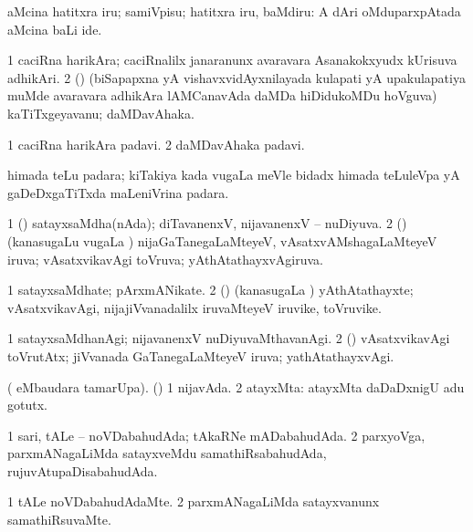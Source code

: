\noindent 
\gl{\pagu}
\expl{}
 aMcina hatitxra iru; samiVpisu; hatitxra iru, baMdiru:  A dAri oMduparxpAtada aMcina baLi ide. \eentry

\bentry
{} 
\gl{\nA}
\bmng
\bnum
\num{1} caciRna harikAra; caciRnalilx janaranunx avaravara Asanakokxyudx kUrisuva adhikAri. 
\num{2} (\birx) (biSapapxna yA vishavxvidAyxnilayada kulapati yA upakulapatiya muMde avaravara adhikAra lAMCanavAda daMDa hiDidukoMDu hoVguva) kaTiTxgeyavanu; daMDavAhaka. 
\enum
\emng
\eentry

\bentry
{} 
\gl{\nA}
\expl{}
\bmng
\bnum
\num{1} caciRna harikAra padavi. 
\num{2} daMDavAhaka padavi. 
\enum
\emng
\eentry

\bentry
{} 
\gl{\nA}
\expl{}
\bmng
 himada teLu padara; kiTakiya kada \mo vugaLa meVle bidadx himada teLuleVpa yA gaDeDxgaTiTxda maLeniVrina padara. 
\emng
\eentry

\bentry
{} 
\gl{\gu}
\expl{}
\bmng
\bnum
\num{1} (\aupa) satayxsaMdha(nAda); diTavanenxV, nijavanenxV -- nuDiyuva. 
\num{2} (\mashA) (kanasugaLu \mo vugaLa \vi) nijaGaTanegaLaMteyeV, vAsatxvAMshagaLaMteyeV iruva; vAsatxvikavAgi toVruva; yAthAtathayxvAgiruva. 
\enum
\emng
\eentry

\bentry
{} 
\gl{\nA}
\expl{}
\bmng
\bnum
\num{1} satayxsaMdhate; pArxmANikate. 
\num{2} (\mashA) (kanasugaLa \vi) yAthAtathayxte; vAsatxvikavAgi, nijajiVvanadalilx iruvaMteyeV iruvike, toVruvike. 
\enum
\emng
\eentry

\bentry
{} 
\gl{\kirxvi}
\expl{}
\bmng
\bnum
\num{1} satayxsaMdhanAgi; nijavanenxV nuDiyuvaMthavanAgi. 
\num{2} (\mashA) vAsatxvikavAgi toVrutAtx; jiVvanada GaTanegaLaMteyeV iruva; yathAtathayxvAgi. 
\enum
\emng
\eentry

\bentry
{} 
\gl{\gu}
\expl{}
\bmng
 ( eMbaudara tamarUpa). (\pArxparx) 
\bnum
\num{1} nijavAda. 
\num{2} atayxMta:  atayxMta daDaDxnigU adu gotutx. 
\enum
\emng
\eentry

\bentry
{} 
\gl{\gu}
\expl{}
\bmng
\bnum
\num{1} sari, tALe -- noVDabahudAda; tAkaRNe mADabahudAda. 
\num{2} parxyoVga, parxmANagaLiMda satayxveMdu samathiRsabahudAda, rujuvAtupaDisabahudAda. 
\enum
\emng
\eentry

\bentry
{} 
\gl{\kirxvi}
\expl{}
\bmng
\bnum
\num{1} tALe noVDabahudAdaMte. 
\num{2} parxmANagaLiMda satayxvanunx samathiRsuvaMte. 
\enum
\emng
\eentry

